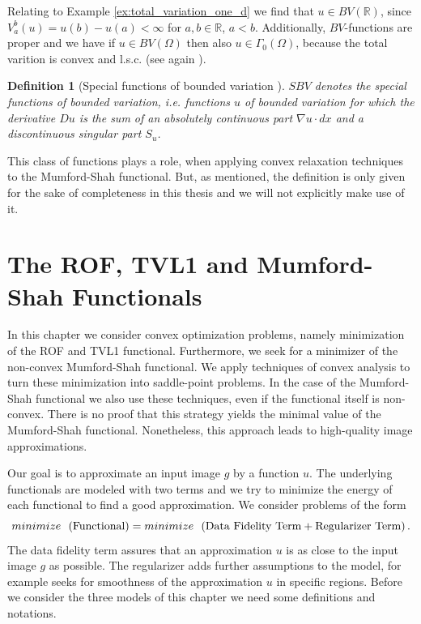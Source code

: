 \documentclass[abstracton]{scrreprt}
\newtheorem{definition}[theorem]{Definition}
\begin{document}
        Relating to Example \ref{ex:total_variation_one_d} we find that $u \in BV(\mathbb{R})$, since $V^{b}_{a}(u) = u(b) - u(a) < \infty$ for $a, b \in \mathbb{R}$, $a < b$.
        Additionally, $BV$-functions are proper and we have if $u \in BV(\Omega)$ then also $u \in \Gamma_{0}(\Omega)$, because the total varition is convex and l.s.c. (see again \cite{Chambolle-et-al-10}).
        \begin{definition}[Special functions of bounded variation \cite{Pock-et-al-iccv09}]
            $SBV$ denotes the special functions of bounded variation, i.e. functions $u$ of bounded variation for which the derivative $Du$ is the sum of an absolutely continuous part $\nabla u \cdot dx$ and a discontinuous singular part $S_{u}$.
        \end{definition}
        This class of functions plays a role, when applying convex relaxation techniques to the Mumford-Shah functional. But, as mentioned, the definition is only given for the sake of completeness in this thesis and we will not explicitly make use of it.



\chapter{The ROF, TVL1 and Mumford-Shah Functionals} %
\label{cha:the_rof_tvl1_and_mumford_shah_functional}

    In this chapter we consider convex optimization problems, namely minimization of the ROF and TVL1 functional. Furthermore, we seek for a minimizer of the non-convex Mumford-Shah functional. We apply techniques of convex analysis to turn these minimization into saddle-point problems. In the case of the Mumford-Shah functional we also use these techniques, even if the functional itself is non-convex. There is no proof that this strategy yields the minimal value of the Mumford-Shah functional. Nonetheless, this approach leads to high-quality image approximations.

    Our goal is to approximate an input image $g$ by a function $u$. The underlying functionals are modeled with two terms and we try to minimize the energy of each functional to find a good approximation. We consider problems of the form
        $$
            minimize \,\,\, \left( \textnormal{Functional} \right) = minimize \,\,\, \left( \textnormal{Data Fidelity Term} + \textnormal{Regularizer Term} \right).
        $$
    The data fidelity term assures that an approximation $u$ is as close to the input image $g$ as possible. The regularizer adds further assumptions to the model, for example seeks for smoothness of the approximation $u$ in specific regions. Before we consider the three models of this chapter we need some definitions and notations.
\end{document}
